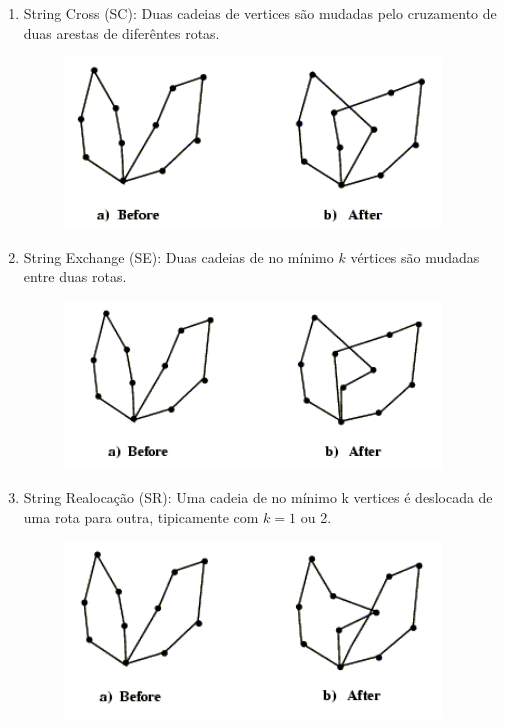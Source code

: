 \begin{enumerate}
\item String Cross (SC): Duas cadeias de vertices são mudadas pelo cruzamento de duas arestas de
diferêntes rotas.

\begin{figure}[!ht]
\centering
\includegraphics[width=10cm]{./fig/BreedSC.png}
\end{figure}

\item String Exchange (SE): Duas cadeias de no mínimo $k$ vértices são mudadas entre duas rotas.

\begin{figure}[!ht]
\centering
\includegraphics[width=10cm]{./fig/BreedSE.png}
\end{figure}

\item String Realocação (SR): Uma cadeia de no mínimo k vertices é deslocada de uma rota para outra,
tipicamente com $k=1$ ou 2.

\begin{figure}[!ht]
\centering
\includegraphics[width=10cm]{./fig/BreedSR.png}
\end{figure}



\end{enumerate}
